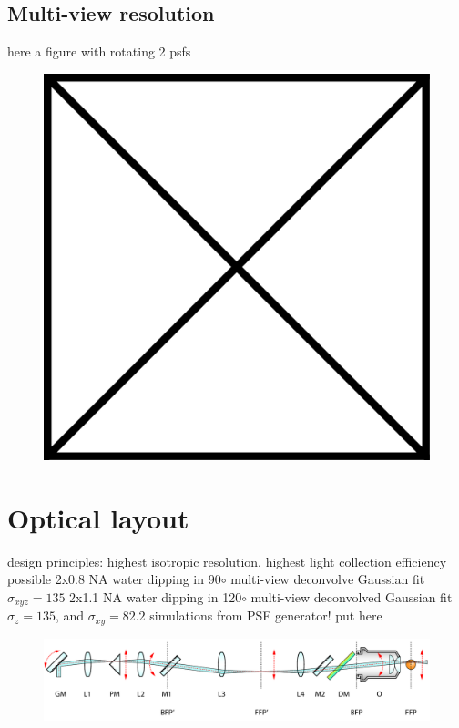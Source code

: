   \subsection{Multi-view resolution}
    here a figure with rotating 2 psfs
      
    \begin{figure}
      \centering
      \includegraphics[width=1\textwidth,height=0.3\textwidth]{placeholder.pdf}
      \label{fig:psf-rot}
    \end{figure}
      


\section{Optical layout}
  design principles:
  highest isotropic resolution, highest light collection efficiency possible
  2x0.8 NA water dipping in 90$\circ$ multi-view deconvolve Gaussian fit $\sigma_{xyz}=135$
  2x1.1 NA water dipping in 120$\circ$ multi-view deconvolved Gaussian fit $\sigma_z = 135$, and $\sigma_{xy} = 82.2$
  simulations from PSF generator! put here

  \begin{figure}[bth]
    \centering
    \includegraphics[page=1,width=1\textwidth]{schematicsLinear}
    \label{fig:schematicsLinear}
  \end{figure}

